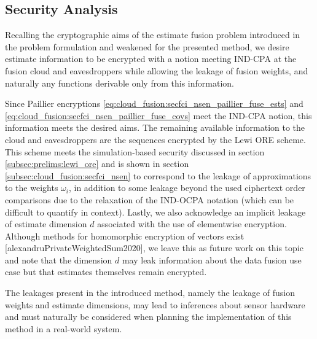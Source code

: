 % 
% 

\subsection{Security Analysis}\label{subsec:cloud_fusion:secfci_security}
Recalling the cryptographic aims of the estimate fusion problem introduced in the problem formulation and weakened for the presented method, we desire estimate information to be encrypted with a notion meeting IND-CPA at the fusion cloud and eavesdroppers while allowing the leakage of fusion weights, and naturally any functions derivable only from this information.

Since Paillier encryptions \eqref{eq:cloud_fusion:secfci_nsen_paillier_fuse_ests} and \eqref{eq:cloud_fusion:secfci_nsen_paillier_fuse_covs} meet the IND-CPA notion, this information meets the desired aims. The remaining available information to the cloud and eavesdroppers are the sequences encrypted by the Lewi ORE scheme. This scheme meets the simulation-based security discussed in section \ref{subsec:prelims:lewi_ore} and is shown in section \ref{subsec:cloud_fusion:secfci_nsen} to correspond to the leakage of approximations to the weights $\omega_i$, in addition to some leakage beyond the used ciphertext order comparisons due to the relaxation of the IND-OCPA notation (which can be difficult to quantify in context). Lastly, we also acknowledge an implicit leakage of estimate dimension $d$ associated with the use of elementwise encryption. Although methods for homomorphic encryption of vectors exist [alexandruPrivateWeightedSum2020], we leave this as future work on this topic and note that the dimension $d$ may leak information about the data fusion use case but that estimates themselves remain encrypted.

The leakages present in the introduced method, namely the leakage of fusion weights and estimate dimensions, may lead to inferences about sensor hardware and must naturally be considered when planning the implementation of this method in a real-world system.

% 
% 

